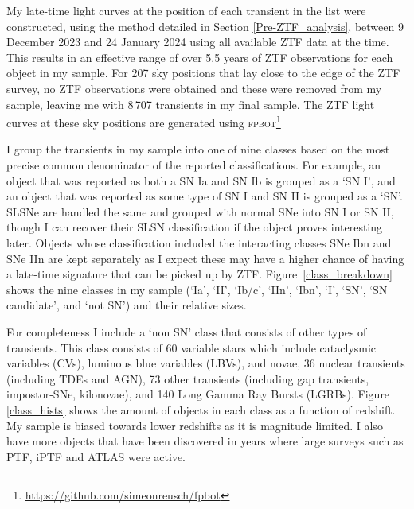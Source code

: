 \documentclass[a4paper,oneside,12pt, class=Latex/Classes/PhDthesisPSnPDF, crop=false]{standalone}
\begin{document}
My late-time light curves at the position of each transient in the list were constructed, using the method detailed in Section \ref{Pre-ZTF_analysis}, between 9 December 2023 and 24 January 2024 using all available ZTF data at the time. This results in an effective range of over 5.5 years of ZTF observations for each object in my sample. For 207 sky positions that lay close to the edge of the ZTF survey, no ZTF observations were obtained and these were removed from my sample, leaving me with 8\,707 transients in my final sample. The ZTF light curves at these sky positions are generated using \textsc{fpbot}\footnote{\url{https://github.com/simeonreusch/fpbot}} \citep{fpbot}

I group the transients in my sample into one of nine classes based on the most precise common denominator of the reported classifications. For example, an object that was reported as both a SN Ia and SN Ib is grouped as a `SN I', and an object that was reported as some type of SN I and SN II is grouped as a `SN'. SLSNe are handled the same and grouped with normal SNe into SN I or SN II, though I can recover their SLSN classification if the object proves interesting later. Objects whose classification included the interacting classes SNe Ibn and SNe IIn are kept separately as I expect these may have a higher chance of having a late-time signature that can be picked up by ZTF. Figure~\ref{class_breakdown} shows the nine classes in my sample (`Ia', `II', `Ib/c', `IIn', `Ibn', `I', `SN', `SN candidate', and `not SN') and their relative sizes. 

For completeness I include a `non SN' class that consists of other types of transients. This class consists of 60 variable stars which include cataclysmic variables (CVs), luminous blue variables (LBVs), and novae, 36 nuclear transients (including TDEs and AGN), 73 other transients (including gap transients, impostor-SNe, kilonovae), and 140 Long Gamma Ray Bursts (LGRBs).
Figure \ref{class_hists} shows the amount of objects in each class as a function of redshift. My sample is biased towards lower redshifts as it is magnitude limited. I also have more objects that have been discovered in years where large surveys such as PTF, iPTF and ATLAS were active.
\end{document}
